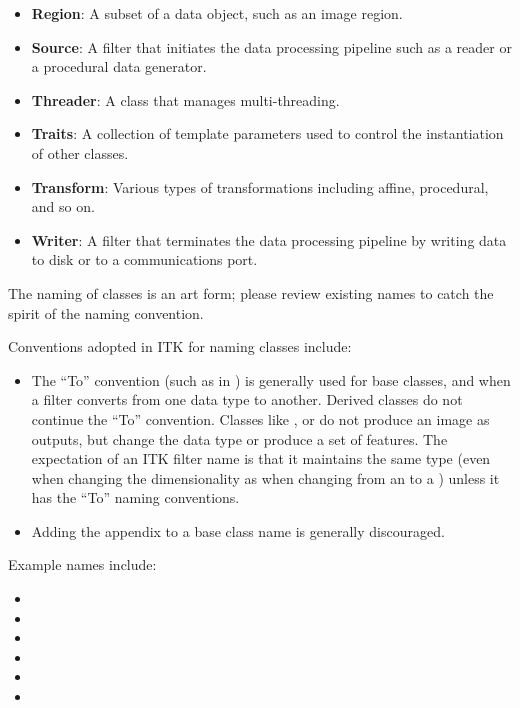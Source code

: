 \begin{itemize}
\item \textbf{Region}: A subset of a data object, such as an image region.
\item \textbf{Source}: A filter that initiates the data processing pipeline such
as a reader or a procedural data generator.
\item \textbf{Threader}: A class that manages multi-threading.
\item \textbf{Traits}: A collection of template parameters used to control the
instantiation of other classes.
\item \textbf{Transform}: Various types of transformations including affine,
procedural, and so on.
\item \textbf{Writer}: A filter that terminates the data processing pipeline by
writing data to disk or to a communications port.
\end{itemize}

The naming of classes is an art form; please review existing names to catch the
spirit of the naming convention.

Conventions adopted in ITK for naming classes include:
\begin{itemize}
\item The ``To'' convention (such as in ) is
generally used for base classes, and when a filter converts from one data type
to another. Derived classes do not continue the ``To'' convention. Classes like
, or
 do not produce an image as outputs, but change
the data type or produce a set of features. The expectation of an ITK filter
name is that it maintains the same type (even when changing the dimensionality
as when changing from an  to a ) unless
it has the ``To'' naming conventions.
\item Adding the  appendix to a base class name is generally
discouraged.
\end{itemize}

Example names include:
\begin{itemize}
\item {}
\item {}
\item {}
\item {}
\item {}
\item {}
\end{itemize}


